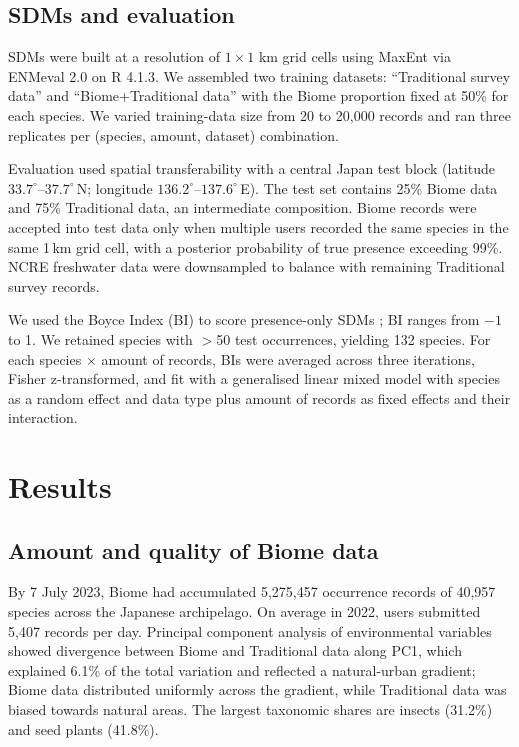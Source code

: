 \documentclass[11pt]{article}
\begin{document}
\subsection{SDMs and evaluation}
SDMs were built at a resolution of $1 \times 1$ km grid cells using MaxEnt via ENMeval 2.0 \citep{kass2021} on R 4.1.3. We assembled two training datasets: ``Traditional survey data'' and ``Biome+Traditional data'' with the Biome proportion fixed at 50\% for each species. We varied training-data size from 20 to 20,000 records and ran three replicates per (species, amount, dataset) combination.

Evaluation used spatial transferability with a central Japan test block (latitude $33.7^\circ$--$37.7^\circ$\,N; longitude $136.2^\circ$--$137.6^\circ$\,E). The test set contains 25\% Biome data and 75\% Traditional data, an intermediate composition. Biome records were accepted into test data only when multiple users recorded the same species in the same 1\,km grid cell, with a posterior probability of true presence exceeding 99\%. NCRE freshwater data were downsampled to balance with remaining Traditional survey records.

We used the Boyce Index (BI) to score presence-only SDMs \citep{hirzel2006}; BI ranges from $-1$ to 1. We retained species with $>$50 test occurrences, yielding 132 species. For each species $\times$ amount of records, BIs were averaged across three iterations, Fisher z-transformed, and fit with a generalised linear mixed model with species as a random effect and data type plus amount of records as fixed effects and their interaction.

\section{Results}
\subsection{Amount and quality of Biome data}
By 7 July 2023, Biome had accumulated 5,275,457 occurrence records of 40,957 species across the Japanese archipelago. On average in 2022, users submitted 5,407 records per day. Principal component analysis of environmental variables showed divergence between Biome and Traditional data along PC1, which explained 6.1\% of the total variation and reflected a natural-urban gradient; Biome data distributed uniformly across the gradient, while Traditional data was biased towards natural areas. The largest taxonomic shares are insects (31.2\%) and seed plants (41.8\%).
\end{document}
